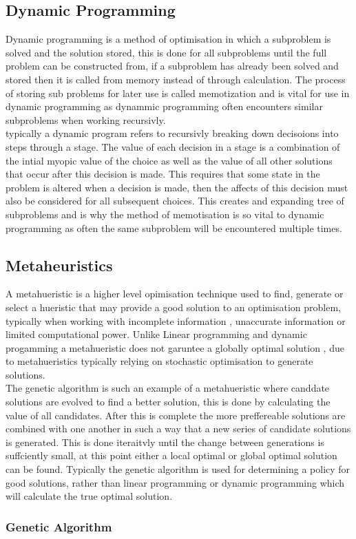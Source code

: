 \subsection{Dynamic Programming} 
Dynamic programming is a method of optimisation in which a subproblem is solved and the solution stored, this is done for all subproblems until the full problem can be constructed from, if a subproblem has already been solved and stored then it is called from memory instead of through calculation. The process of storing sub problems for later use is called memotization and is vital for use in dynamic programming as dynammic programming often encounters similar subproblems when working recursivly. \\
typically a dynamic program refers to recursivly breaking down decisoions into steps through a stage. The value of each decision in a stage is a combination of the intial myopic value of the choice as well as the value of all other solutions that occur after this decision is made. This requires that some state in the problem is altered when a decision is made, then the affects of this decision must also be considered for all subsequent choices. This creates and expanding tree of subproblems and is why the method of memotisation is so vital to dynamic programming as often the same subproblem will be encountered multiple times. 
\subsection{Metaheuristics} %
A metahueristic is a higher level opimisation technique used to find, generate or select a hueristic that may provide a good solution to an optimisation problem, typically when working with incomplete information , unaccurate information or limited computational power. Unlike Linear programming and dynamic progamming a metahueristic does not garuntee a globally optimal solution , due to metahueristics typically relying on stochastic optimisation to generate solutions. \\
The genetic algorithm is such an example of a metahueristic where canddate solutions are evolved to find a better solution, this is done by calculating the value of all candidates. After this is complete the more preffereable solutions are combined with one another in such a way that a new series of candidate solutions is generated. This is done iteraitvly until the change between generations is suffciently small, at this point either a local optimal or global optimal solution can be found. Typically the genetic algorithm is used for determining a policy for good solutions, rather than linear programming or dynamic programming which will calculate the true optimal solution. 
\subsubsection{Genetic Algorithm}
